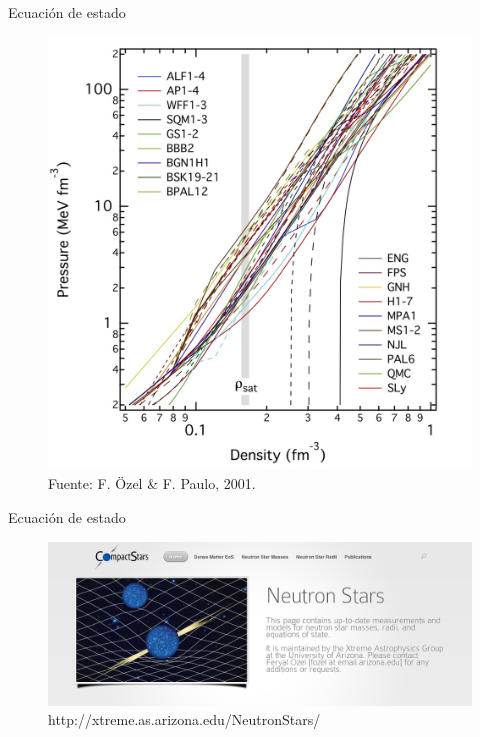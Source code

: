 \documentclass[11pt]{beamer}
\begin{document}
\begin{frame}{Ecuación de estado}
    \begin{figure}
        \centering
        \includegraphics[width=0.65\linewidth]{EoS.jpg}
        \caption{Fuente: F. Özel \& F. Paulo, 2001.}
    \end{figure}
\end{frame}


\begin{frame}{Ecuación de estado}
    \begin{figure}
        \centering
        \includegraphics[width=1\linewidth]{DEOS.png}
        \caption{http://xtreme.as.arizona.edu/NeutronStars/}
    \end{figure}
\end{frame}
\end{document}
